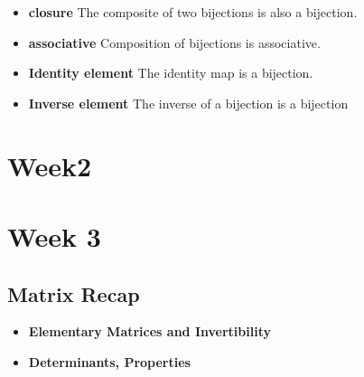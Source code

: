 \documentclass{article}
\begin{document}
\begin{enumerate}
    \begin{itemize}
        \item \textbf{closure} The composite of two bijections is also a bijection.
        \item \textbf{associative} Composition of bijections is associative.
        \item \textbf{Identity element} The identity map is a bijection.
        \item \textbf{Inverse element} The inverse of a bijection is a bijection
    \end{itemize}  


\end{enumerate}

\section{Week2}

\section{Week 3}

\subsection*{Matrix Recap}
\begin{itemize}
    \item \textbf{Elementary Matrices and Invertibility}
    \item \textbf{Determinants, Properties}
\end{itemize}
\end{document}
